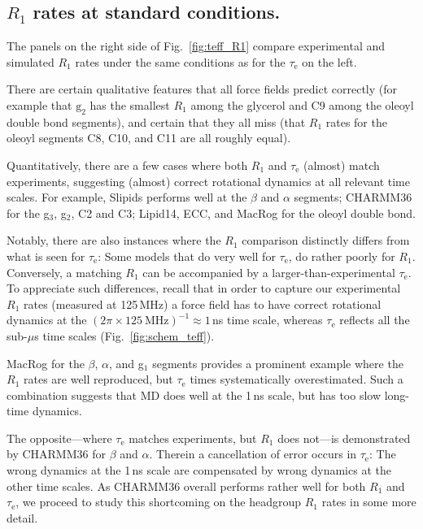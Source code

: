 \documentclass[journal=jcisd8,manuscript=article,layout=twocolumn]{achemso}
\begin{document}
\subsection*{$R_1$ rates at standard conditions.}
The panels on the right side of Fig.~\ref{fig:teff_R1} compare experimental and simulated $R_{1}$ rates under the same conditions as for the $\tau_\mathrm{e}$ on the left.

There are certain qualitative features that all force fields predict correctly
(for example that $\mathrm g_2$ has the smallest $R_1$ among the glycerol and C9 among the oleoyl double bond segments),
and certain that they all miss (that $R_1$ rates for the oleoyl segments C8, C10, and C11 are all roughly equal).

Quantitatively,
there are a few cases where both $R_1$ and $\tau_\mathrm{e}$ (almost) match experiments, suggesting (almost) correct rotational dynamics at all relevant time scales.
%
%
For example, 
Slipids performs well at the $\beta$ and $\alpha$ segments;
CHARMM36 for the g$_3$, g$_2$,  C2 and C3;
Lipid14, ECC, and MacRog for the oleoyl double bond.

Notably, there are also instances where the $R_1$ comparison distinctly differs from what is seen for $\tau_\mathrm{e}$: Some models that do very well for $\tau_\mathrm{e}$, do rather poorly for $R_1$. Conversely, a matching $R_{1}$ can be accompanied by a larger-than-experimental $\tau_\mathrm{e}$.
To appreciate such differences,  recall that in order to capture our experimental $R_1$ rates (measured at 125\,MHz) a force field has to have correct rotational dynamics at the $(2\pi\times125~\mathrm{MHz})^{-1}\approx1$\,ns time scale, whereas
$\tau_\mathrm{e}$ reflects all the sub-$\mu$s time scales (Fig.~\ref{fig:schem_teff}).

MacRog for the $\beta$, $\alpha$, and g$_1$ segments provides a prominent example where
the $R_1$ rates are well reproduced, but $\tau_\mathrm e$ times systematically overestimated.
Such a combination suggests that MD does well at the 1\,ns scale, but has too slow long-time dynamics.

The opposite---where $\tau_\mathrm{e}$ matches experiments, but $R_1$ does not---is demonstrated by CHARMM36 for $\beta$ and $\alpha$. Therein a cancellation of error occurs in $\tau_\mathrm{e}$: The wrong dynamics at the 1\,ns scale are compensated by wrong dynamics at the other time scales.
As CHARMM36 overall performs rather well for both $R_1$ and $\tau_\mathrm{e}$,
we proceed to study this shortcoming on the headgroup $R_1$ rates
in some more detail.
%
\end{document}
